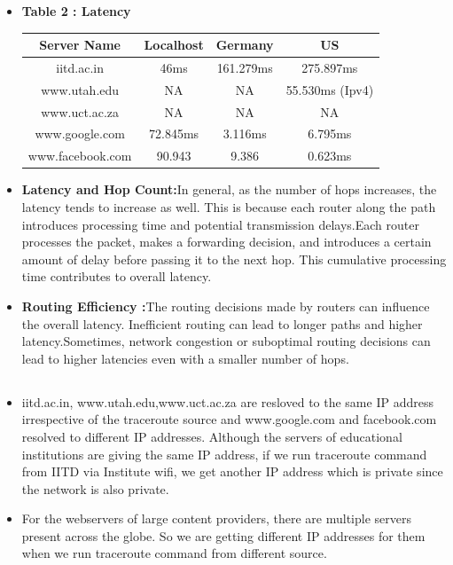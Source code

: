 \documentclass{article}
\begin{document}
\begin{itemize}
   \item \textbf{Table 2 : Latency}

\begin{tabular}{|c|c|c|c|}
  \hline
  \textbf{Server Name} & \textbf{Localhost} & \textbf{Germany} & \textbf{US}\\
  \hline
  iitd.ac.in & 46ms & 161.279ms & 275.897ms \\
  \hline
   www.utah.edu & NA  & NA & 55.530ms (Ipv4)     \\
  \hline
   www.uct.ac.za & NA & NA & NA\\
  \hline
  www.google.com & 72.845ms & 3.116ms & 6.795ms \\
  \hline
  www.facebook.com & 90.943 &9.386 & 0.623ms \\
  \hline
\end{tabular}
\item \textbf{Latency and Hop Count:}In general, as the number of hops increases, the latency tends to increase as well. This is because each router along the path introduces processing time and potential transmission delays.Each router processes the packet, makes a forwarding decision, and introduces a certain amount of delay before passing it to the next hop. This cumulative processing time contributes to overall latency.
\item\textbf{Routing Efficiency :}The routing decisions made by routers can influence the overall latency. Inefficient routing can lead to longer paths and higher latency.Sometimes, network congestion or suboptimal routing decisions can lead to higher latencies even with a smaller number of hops.


\end{itemize}
\subsection{}
\begin{itemize}
    \item iitd.ac.in, www.utah.edu,www.uct.ac.za are resloved to the same IP address irrespective of the traceroute source and www.google.com and facebook.com resolved to different IP addresses. Although the servers of educational institutions are giving the same IP address, if we run traceroute command from IITD via Institute wifi, we get another IP address which is private since the network is also private.
    \item For the webservers of large content providers, there are multiple servers present across the globe. So we are getting different IP addresses for them when we run traceroute command from different source.


\end{itemize}
\end{document}
